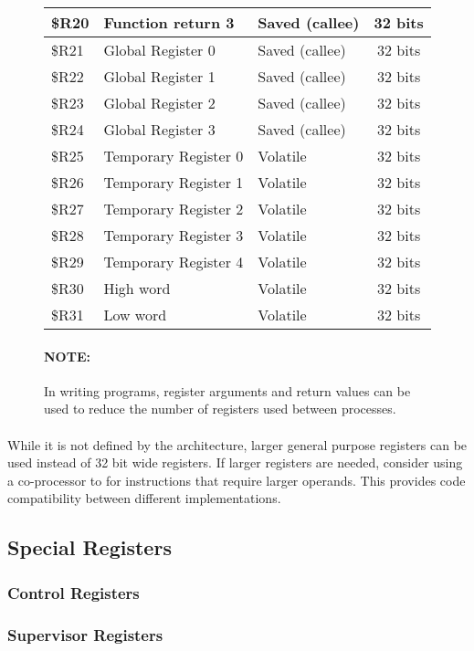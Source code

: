 \documentclass[letterpaper, 11pt]{article}
\begin{document}
\begin{figure}[!h]
\begin{center}
\begin{tabular}{|l|l|l|c|}
			\$R20 & Function return 3 & Saved (callee) &32 bits \\ \hline
			\$R21 & Global Register 0 & Saved (callee) &32 bits \\ \hline
			\$R22 & Global Register 1 & Saved (callee) &32 bits \\ \hline
			\$R23 & Global Register 2 & Saved (callee) &32 bits \\ \hline
			\$R24 & Global Register 3 & Saved (callee) &32 bits \\ \hline
			\$R25 & Temporary Register 0 & Volatile &32 bits \\ \hline
			\$R26 & Temporary Register 1 & Volatile  &32 bits \\ \hline
			\$R27 & Temporary Register 2 & Volatile &32 bits \\ \hline
			\$R28 & Temporary Register 3 & Volatile &32 bits \\ \hline
			\$R29 & Temporary Register 4 & Volatile &32 bits \\ \hline
			\$R30 & High word & Volatile  &32 bits \\ \hline
			\$R31 & Low word & Volatile &32 bits \\ \hline
		\end{tabular} 

	\end{center}
\paragraph{NOTE:} In writing programs, register arguments and return values can be used to reduce the number of registers used between processes. 
\end{figure}
\paragraph{}While it is not defined by the architecture, larger general purpose registers can be used instead of 32 bit wide registers. If larger registers are needed, consider using a co-processor to for instructions that require larger operands. This provides code compatibility between different implementations.
\subsection{Special Registers}
\subsubsection{Control Registers}
\subsubsection{Supervisor Registers}
\end{document}
